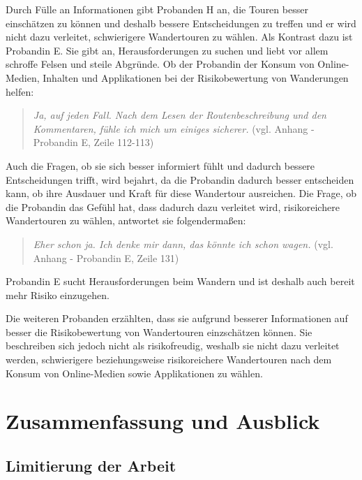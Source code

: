 Durch Fülle an Informationen gibt Probanden H an, die Touren besser einschätzen zu können und deshalb bessere Entscheidungen zu treffen und er wird nicht dazu verleitet, schwierigere Wandertouren zu wählen. Als Kontrast dazu ist Probandin E. Sie gibt an, Herausforderungen zu suchen und liebt vor allem schroffe Felsen und steile Abgründe. Ob der Probandin der Konsum von Online-Medien, Inhalten und Applikationen bei der Risikobewertung von Wanderungen helfen:

\begin{quote}
	\textit{\glqq Ja, auf jeden Fall. Nach dem Lesen der Routenbeschreibung und den Kommentaren, fühle ich mich um einiges sicherer.\grqq} (vgl. Anhang - Probandin E, Zeile 112-113)
\end{quote}

Auch die Fragen, ob sie sich besser informiert fühlt und dadurch bessere Entscheidungen trifft, wird bejahrt, da die Probandin dadurch besser entscheiden kann, ob ihre Ausdauer und Kraft für diese Wandertour ausreichen. Die Frage, ob die Probandin das Gefühl hat, dass dadurch dazu verleitet wird, risikoreichere Wandertouren zu wählen, antwortet sie folgendermaßen:

\begin{quote}
	\textit{\glqq Eher schon ja. Ich denke mir dann, das könnte ich schon wagen.\grqq} (vgl. Anhang - Probandin E, Zeile 131)
\end{quote}

Probandin E sucht Herausforderungen beim Wandern und ist deshalb auch bereit mehr Risiko einzugehen.

Die weiteren Probanden erzählten, dass sie aufgrund besserer Informationen auf besser die Risikobewertung von Wandertouren einzschätzen können. Sie beschreiben sich jedoch nicht als risikofreudig, weshalb sie nicht dazu verleitet werden, schwierigere beziehungsweise risikoreichere Wandertouren nach dem Konsum von Online-Medien sowie Applikationen zu wählen.





\chapter{Zusammenfassung und Ausblick}


\section{Limitierung der Arbeit}









